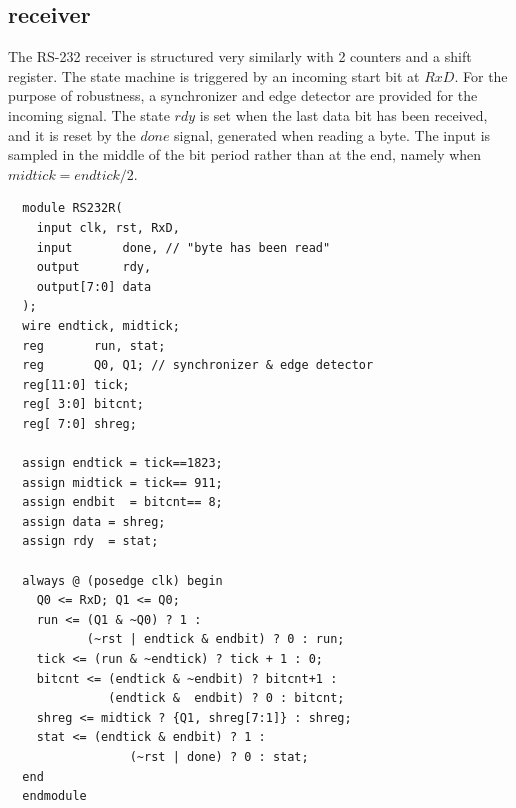 \subsection{receiver}
The RS-232 receiver is structured very similarly with 2 counters and a shift register. The state
machine is triggered by an incoming start bit at $RxD$. For the purpose of robustness, a
synchronizer and edge detector are provided for the incoming signal. The state $rdy$ is set when
the last data bit has been received, and it is reset by the $done$ signal, generated when reading
a byte. The input is sampled in the middle of the bit period rather than at the end, namely when
$midtick = endtick/2$.
\begin{verbatim}
  module RS232R(
    input clk, rst, RxD,
    input       done, // "byte has been read"
    output      rdy,
    output[7:0] data
  );
  wire endtick, midtick;
  reg       run, stat;
  reg       Q0, Q1; // synchronizer & edge detector
  reg[11:0] tick;
  reg[ 3:0] bitcnt;
  reg[ 7:0] shreg;

  assign endtick = tick==1823;
  assign midtick = tick== 911;
  assign endbit  = bitcnt== 8;
  assign data = shreg;
  assign rdy  = stat;

  always @ (posedge clk) begin
    Q0 <= RxD; Q1 <= Q0;
    run <= (Q1 & ~Q0) ? 1 :
           (~rst | endtick & endbit) ? 0 : run;
    tick <= (run & ~endtick) ? tick + 1 : 0;
    bitcnt <= (endtick & ~endbit) ? bitcnt+1 :
              (endtick &  endbit) ? 0 : bitcnt;
    shreg <= midtick ? {Q1, shreg[7:1]} : shreg;
    stat <= (endtick & endbit) ? 1 :
                 (~rst | done) ? 0 : stat;
  end
  endmodule
\end{verbatim}
